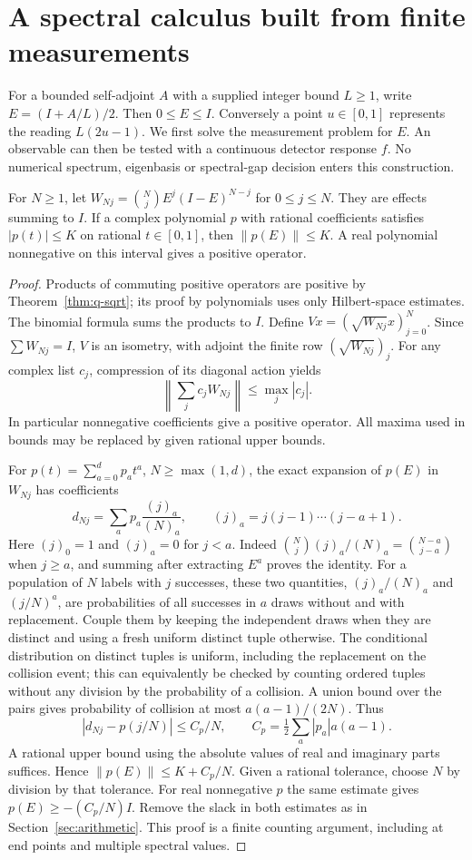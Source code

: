 \section{A spectral calculus built from finite measurements}\label{sec:spectrum}
For a bounded self-adjoint $A$ with a supplied integer bound $L\ge1$, write $E=(I+A/L)/2$. Then $0\le E\le I$. Conversely a point $u\in[0,1]$ represents the reading $L(2u-1)$. We first solve the measurement problem for $E$. An observable can then be tested with a continuous detector response $f$. No numerical spectrum, eigenbasis or spectral-gap decision enters this construction.

\begin{lemma}\label{lem:binomial}
For $N\ge1$, let $W_{Nj}={N\choose j}E^j(I-E)^{N-j}$ for $0\le j\le N$. They are effects summing to $I$. If a complex polynomial $p$ with rational coefficients satisfies $|p(t)|\le K$ on rational $t\in[0,1]$, then $\|p(E)\|\le K$. A real polynomial nonnegative on this interval gives a positive operator.
\end{lemma}
\begin{proof}
Products of commuting positive operators are positive by Theorem~\ref{thm:q-sqrt}; its proof by polynomials uses only Hilbert-space estimates. The binomial formula sums the products to $I$. Define $Vx=(\sqrt{W_{Nj}}x)_{j=0}^N$. Since $\sum W_{Nj}=I$, $V$ is an isometry, with adjoint the finite row $(\sqrt{W_{Nj}})_j$. For any complex list $c_j$, compression of its diagonal action yields
\[
 \left\|\sum_j c_jW_{Nj}\right\|\le\max_j |c_j|.
\]
In particular nonnegative coefficients give a positive operator. All maxima used in bounds may be replaced by given rational upper bounds.

For $p(t)=\sum_{a=0}^{d}p_at^a$, $N\ge\max(1,d)$, the exact expansion of $p(E)$ in $W_{Nj}$ has coefficients
\[
 d_{Nj}=\sum_a p_a\frac{(j)_a}{(N)_a},\qquad (j)_a=j(j-1)\cdots(j-a+1).
\]
Here $(j)_0=1$ and $(j)_a=0$ for $j<a$. Indeed ${N\choose j}(j)_a/(N)_a={N-a\choose j-a}$ when $j\ge a$, and summing after extracting $E^a$ proves the identity. For a population of $N$ labels with $j$ successes, these two quantities, $(j)_a/(N)_a$ and $(j/N)^a$, are probabilities of all successes in $a$ draws without and with replacement. Couple them by keeping the independent draws when they are distinct and using a fresh uniform distinct tuple otherwise. The conditional distribution on distinct tuples is uniform, including the replacement on the collision event; this can equivalently be checked by counting ordered tuples without any division by the probability of a collision. A union bound over the pairs gives probability of collision at most $a(a-1)/(2N)$. Thus
\[
  |d_{Nj}-p(j/N)|\le C_p/N,\qquad C_p=\tfrac12\sum_a |p_a|a(a-1).
\]
A rational upper bound using the absolute values of real and imaginary parts suffices. Hence $\|p(E)\|\le K+C_p/N$. Given a rational tolerance, choose $N$ by division by that tolerance. For real nonnegative $p$ the same estimate gives $p(E)\ge-(C_p/N)I$. Remove the slack in both estimates as in Section~\ref{sec:arithmetic}. This proof is a finite counting argument, including at end points and multiple spectral values.
\end{proof}

